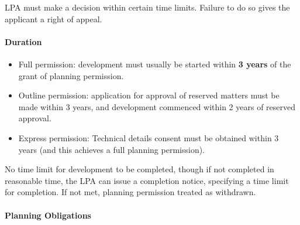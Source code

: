 \documentclass[
]{article}
\providecommand{\tightlist}{%
  \setlength{\itemsep}{0pt}\setlength{\parskip}{0pt}}
\begin{document}
LPA must make a decision within certain time limits. Failure to do so
gives the applicant a right of appeal.

\hypertarget{duration}{%
\paragraph{Duration}\label{duration}}

\begin{itemize}
\tightlist
\item
  Full permission: development must usually be started within \textbf{3
  years} of the grant of planning permission.
\item
  Outline permission: application for approval of reserved matters must
  be made within 3 years, and development commenced within 2 years of
  reserved approval.
\item
  Express permission: Technical details consent must be obtained within
  3 years (and this achieves a full planning permission).
\end{itemize}

No time limit for development to be completed, though if not completed
in reasonable time, the LPA can issue a completion notice, specifying a
time limit for completion. If not met, planning permission treated as
withdrawn.

\hypertarget{planning-obligations}{%
\paragraph{Planning Obligations}\label{planning-obligations}}
\end{document}
